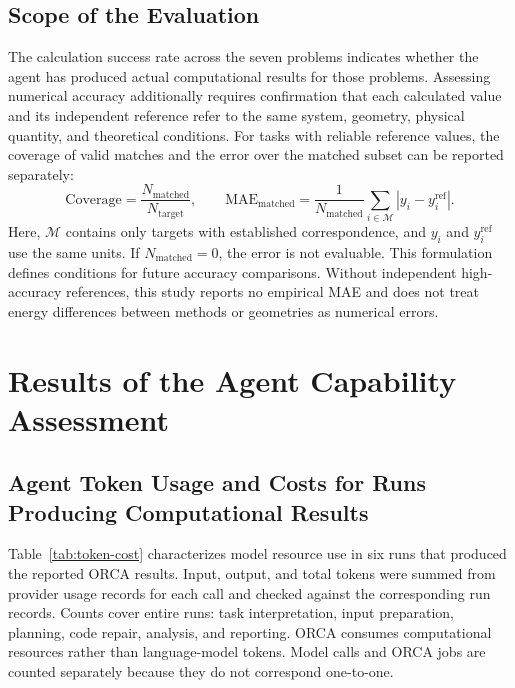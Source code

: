 \subsection{Scope of the Evaluation}
The calculation success rate across the seven problems indicates whether the agent has produced actual computational results for those problems.
Assessing numerical accuracy additionally requires confirmation that each calculated value and its independent reference
refer to the same system, geometry, physical quantity, and theoretical conditions.
For tasks with reliable reference values, the coverage of valid matches and the error over the matched subset can be reported separately:
\begin{equation}
  \mathrm{Coverage}=\frac{N_{\mathrm{matched}}}{N_{\mathrm{target}}},
  \qquad
  \mathrm{MAE}_{\mathrm{matched}}=
  \frac{1}{N_{\mathrm{matched}}}\sum_{i\in\mathcal M}|y_i-y_i^{\mathrm{ref}}|.
  \label{eq:coverage-accuracy}
\end{equation}
Here, $\mathcal M$ contains only targets with established correspondence,
and $y_i$ and $y_i^{\mathrm{ref}}$ use the same units.
If $N_{\mathrm{matched}}=0$, the error is not evaluable.
This formulation defines conditions for future accuracy comparisons.
Without independent high-accuracy references, this study reports no empirical MAE
and does not treat energy differences between methods or geometries as numerical errors.

\section{Results of the Agent Capability Assessment}


\subsection{Agent Token Usage and Costs for Runs Producing Computational Results}
\label{sec:token-cost}
Table~\ref{tab:token-cost} characterizes model resource use in six runs that produced the reported ORCA results.
Input, output, and total tokens were summed from provider usage records for each call
and checked against the corresponding run records.
Counts cover entire runs: task interpretation, input preparation, planning, code repair, analysis, and reporting.
ORCA consumes computational resources rather than language-model tokens.
Model calls and ORCA jobs are counted separately because they do not correspond one-to-one.

